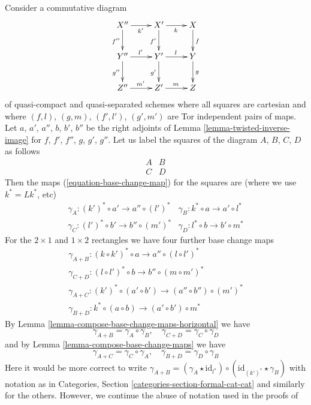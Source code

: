 \begin{remark}
\label{remark-going-around}
Consider a commutative diagram
$$
\xymatrix{
X'' \ar[r]_{k'} \ar[d]_{f''} & X' \ar[r]_k \ar[d]_{f'} & X \ar[d]^f \\
Y'' \ar[r]^{l'} \ar[d]_{g''} & Y' \ar[r]^l \ar[d]_{g'} & Y \ar[d]^g \\
Z'' \ar[r]^{m'} & Z' \ar[r]^m & Z
}
$$
of quasi-compact and quasi-separated schemes where
all squares are cartesian and where
$(f, l)$, $(g, m)$, $(f', l')$, $(g', m')$ are
Tor independent pairs of maps.
Let $a$, $a'$, $a''$, $b$, $b'$, $b''$ be the
right adjoints of Lemma \ref{lemma-twisted-inverse-image}
for $f$, $f'$, $f''$, $g$, $g'$, $g''$.
Let us label the squares of the diagram $A$, $B$, $C$, $D$
as follows
$$
\begin{matrix}
A & B \\
C & D
\end{matrix}
$$
Then the maps (\ref{equation-base-change-map})
for the squares are (where we use $k^* = Lk^*$, etc)
$$
\begin{matrix}
\gamma_A : (k')^* \circ a' \to a'' \circ (l')^* &
\gamma_B : k^* \circ a \to a' \circ l^* \\
\gamma_C : (l')^* \circ b' \to b'' \circ (m')^* &
\gamma_D : l^* \circ b \to b' \circ m^*
\end{matrix}
$$
For the $2 \times 1$ and $1 \times 2$ rectangles we have four further
base change maps
$$
\begin{matrix}
\gamma_{A + B} : (k \circ k')^* \circ a \to a'' \circ (l \circ l')^* \\
\gamma_{C + D} : (l \circ l')^* \circ b \to b'' \circ (m \circ m')^* \\
\gamma_{A + C} : (k')^* \circ (a' \circ b') \to (a'' \circ b'') \circ (m')^* \\
\gamma_{B + D} : k^* \circ (a \circ b) \to (a' \circ b') \circ m^*
\end{matrix}
$$
By Lemma \ref{lemma-compose-base-change-maps-horizontal} we have
$$
\gamma_{A + B} = \gamma_A \circ \gamma_B, \quad
\gamma_{C + D} = \gamma_C \circ \gamma_D
$$
and by Lemma \ref{lemma-compose-base-change-maps} we have
$$
\gamma_{A + C} = \gamma_C \circ \gamma_A, \quad
\gamma_{B + D} = \gamma_D \circ \gamma_B
$$
Here it would be more correct to write
$\gamma_{A + B} = (\gamma_A \star \text{id}_{l^*}) \circ
(\text{id}_{(k')^*} \star \gamma_B)$ with notation as in
Categories, Section \ref{categories-section-formal-cat-cat}
and similarly for the others. However, we continue the
abuse of notation used in the proofs of

\end{remark}
